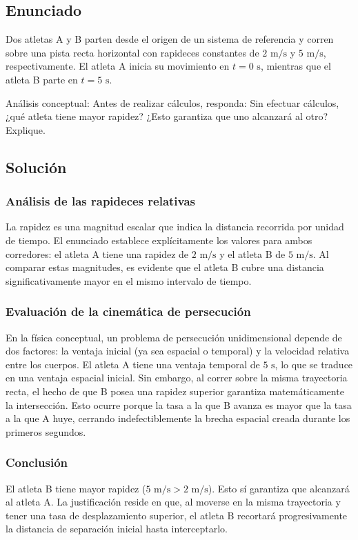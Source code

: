 \documentclass[12pt, a4paper]{article}
\begin{document}
\subsection*{Enunciado}
Dos atletas A y B parten desde el origen de un sistema de referencia y corren sobre una pista recta horizontal con rapideces constantes de $2\text{ m/s}$ y $5\text{ m/s}$, respectivamente. El atleta A inicia su movimiento en $t = 0\text{ s}$, mientras que el atleta B parte en $t = 5\text{ s}$.

Análisis conceptual: Antes de realizar cálculos, responda: Sin efectuar cálculos, ¿qué atleta tiene mayor rapidez? ¿Esto garantiza que uno alcanzará al otro? Explique.

\subsection*{Solución}

\subsubsection*{Análisis de las rapideces relativas}
La rapidez es una magnitud escalar que indica la distancia recorrida por unidad de tiempo. El enunciado establece explícitamente los valores para ambos corredores: el atleta A tiene una rapidez de $2\text{ m/s}$ y el atleta B de $5\text{ m/s}$. Al comparar estas magnitudes, es evidente que el atleta B cubre una distancia significativamente mayor en el mismo intervalo de tiempo.

\subsubsection*{Evaluación de la cinemática de persecución}
En la física conceptual, un problema de persecución unidimensional depende de dos factores: la ventaja inicial (ya sea espacial o temporal) y la velocidad relativa entre los cuerpos. El atleta A tiene una ventaja temporal de $5\text{ s}$, lo que se traduce en una ventaja espacial inicial. Sin embargo, al correr sobre la misma trayectoria recta, el hecho de que B posea una rapidez superior garantiza matemáticamente la intersección. Esto ocurre porque la tasa a la que B avanza es mayor que la tasa a la que A huye, cerrando indefectiblemente la brecha espacial creada durante los primeros segundos.

\subsubsection*{Conclusión}
El atleta B tiene mayor rapidez ($5\text{ m/s} > 2\text{ m/s}$). Esto sí garantiza que alcanzará al atleta A. La justificación reside en que, al moverse en la misma trayectoria y tener una tasa de desplazamiento superior, el atleta B recortará progresivamente la distancia de separación inicial hasta interceptarlo.
\end{document}
